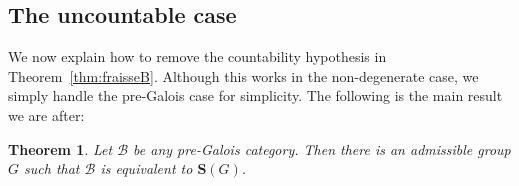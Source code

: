 \documentclass[12pt]{amsart}
\newcommand{\Acom}[1]{\textcolor{blue}{[#1]}}
\numberwithin{equation}{section}
\newtheorem{theorem}[equation]{Theorem}
\newtheorem{proposition}[equation]{Proposition}
\newtheorem{corollary}[equation]{Corollary}
\theoremstyle{definition}
\newcommand{\cB}{\mathcal{B}}
\newcommand{\rB}{\mathrm{B}}
\newcommand{\bS}{\mathbf{S}}
\newcommand{\bT}{\mathbf{T}}
\DeclareMathOperator{\Aut}{Aut}
\newcommand{\op}{\mathrm{op}}
\begin{document}
%
%
%
%
%
%

\subsection{The uncountable case}

We now explain how to remove the countability hypothesis in Theorem~\ref{thm:fraisseB}. Although this works in the non-degenerate case, we simply handle the pre-Galois case for simplicity. The following is the main result we are after:

\begin{theorem} \label{thm:uncountable}
Let $\cB$ be any pre-Galois category. Then there is an admissible group $G$ such that $\cB$ is equivalent to $\bS(G)$.
\end{theorem}
\end{document}
